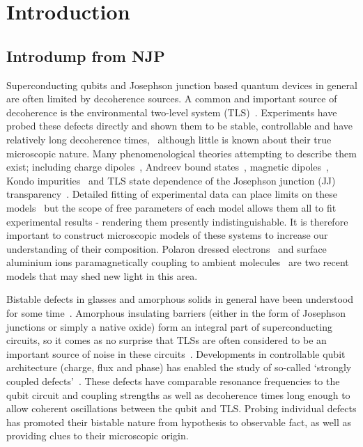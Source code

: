 \chapter{Introduction}

\section{Introdump from NJP}
Superconducting qubits and Josephson junction based quantum devices in general are often limited by decoherence sources.
A common and important source of decoherence is the environmental two-level system (TLS)~\cite{Dutta1981, Shnirman2005}.
Experiments have probed these defects directly and shown them to be stable, controllable and have relatively long decoherence times,~\cite{Simmonds2004, Neeley2008, Shalibo2010, Lupascu2009, Lisenfeld2010, Gunnarsson2013} although little is known about their true microscopic nature.
Many phenomenological theories attempting to describe them exist; including charge dipoles~\cite{Martinis2005}, Andreev bound states~\cite{deSousa2009}, magnetic dipoles~\cite{Sendelbach2008}, Kondo impurities~\cite{Faoro2007} and TLS state dependence of the Josephson junction (JJ) transparency~\cite{Ku2005}.
Detailed fitting of experimental data can place limits on these models~\cite{Cole2010} but the scope of free parameters of each model allows them all to fit experimental results - rendering them presently indistinguishable.
It is therefore important to construct microscopic models of these systems to increase our understanding of their composition.
Polaron dressed electrons~\cite{Agarwal2013} and surface aluminium ions paramagnetically coupling to ambient molecules~\cite{Lee2014} are two recent models that may shed new light in this area.

Bistable defects in glasses and amorphous solids in general have been understood for some time~\cite{Anderson1972}.
Amorphous insulating barriers (either in the form of Josephson junctions or simply a native oxide) form an integral part of superconducting circuits, so it comes as no surprise that TLSs are often considered to be an important source of noise in these circuits~\cite{Dutta1981, Shnirman2005, Martinis2005}.
Developments in controllable qubit architecture (charge, flux and phase) has enabled the study of so-called `strongly coupled defects'~\cite{Neeley2008, Lupascu2009, Lisenfeld2010}.
These defects have comparable resonance frequencies to the qubit circuit and coupling strengths as well as decoherence times long enough to allow coherent oscillations between the qubit and TLS.
Probing individual defects has promoted their bistable nature from hypothesis to observable fact, as well as providing clues to their microscopic origin.

